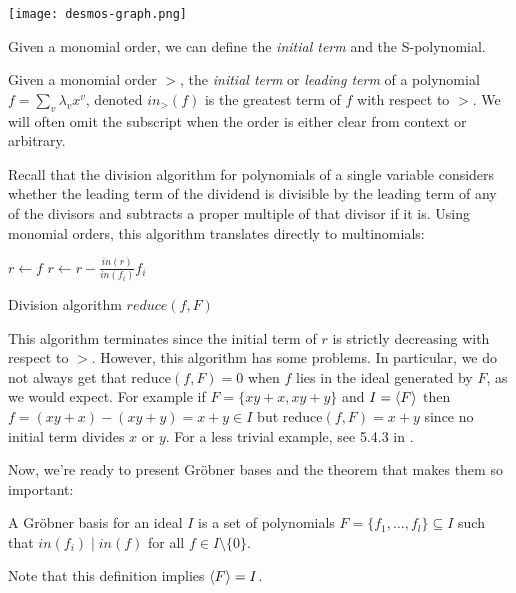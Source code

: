 \documentclass{article}
\theoremstyle{changedot}
\theoremstyle{changedotbreak}
\theoremstyle{nonumberplain}
\DeclarePairedDelimiter{\tuple}{\langle}{\rangle}
\begin{document}
\begin{center}
  \texttt{[image: desmos-graph.png]}
\end{center}


Given a monomial order, we can define the \emph{initial term} and the S-polynomial.

\begin{definition}
  Given a monomial order $>$, the \emph{initial term} or \emph{leading term} of a polynomial $f = \sum_{v} \lambda_{v} x^{v}$, denoted $in_{>}(f)$ is the greatest term of $f$ with respect to $>$. We will often omit the subscript when the order is either clear from context or arbitrary.
\end{definition}

Recall that the division algorithm for polynomials of a single variable considers whether the leading term of the dividend is divisible by the leading term of any of the divisors and subtracts a proper multiple of that divisor if it is. Using monomial orders, this algorithm translates directly to multinomials:

\begin{algorithm}[H]
\DontPrintSemicolon

  $r \leftarrow f$\;
    {
        $r \leftarrow r - \frac{in(r)}{in(f_{i})} f_{i}$
    }

    \caption{Division algorithm $reduce(f, F)$}
    \label{alg:div}
\end{algorithm}

This algorithm terminates since the initial term of $r$ is strictly decreasing with respect to $>$. However, this algorithm has some problems. In particular, we do not always get that $\text{reduce}(f, F) = 0$ when $f$ lies in the ideal generated by $F$, as we would expect. For example if $F = \{xy+x, xy+y\}$ and $I = \tuple{F}$ then $f = (xy+x) - (xy+y) = x+y \in I$ but $\text{reduce}(f, F) = x+y$ since no initial term divides $x$ or $y$. For a less trivial example, see 5.4.3 in \cite{NL}.

Now, we're ready to present Gröbner bases and the theorem that makes them so important:

\begin{definition}
  A Gröbner basis for an ideal $I$ is a set of polynomials $F = \{f_{1}, \dots, f_{l}\} \subseteq I$ such that $in(f_{i}) \mid in(f)$ for all $f \in I\setminus \{0\}$.
\end{definition}
Note that this definition implies $\tuple F = I$.
\end{document}
